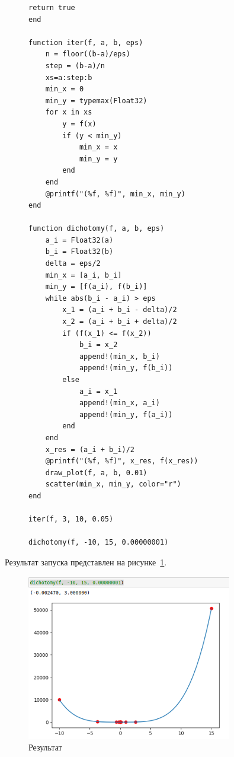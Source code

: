 \documentclass[a4paper, 14pt]{extarticle}
\begin{document}
\begin{figure}[!htb]
\begin{lstlisting}[language={},caption={Нахождение минимумов функции (продолжение)},label={lst:code2}]
    return true
end

function iter(f, a, b, eps)
    n = floor((b-a)/eps)
    step = (b-a)/n
    xs=a:step:b
    min_x = 0
    min_y = typemax(Float32)
    for x in xs
        y = f(x)
        if (y < min_y)
            min_x = x
            min_y = y
        end
    end
    @printf("(%f, %f)", min_x, min_y)
end

function dichotomy(f, a, b, eps)
    a_i = Float32(a)
    b_i = Float32(b)
    delta = eps/2
    min_x = [a_i, b_i]
    min_y = [f(a_i), f(b_i)]
    while abs(b_i - a_i) > eps
        x_1 = (a_i + b_i - delta)/2
        x_2 = (a_i + b_i + delta)/2
        if (f(x_1) <= f(x_2))
            b_i = x_2
            append!(min_x, b_i)
            append!(min_y, f(b_i))
        else
            a_i = x_1
            append!(min_x, a_i)
            append!(min_y, f(a_i))
        end
    end
    x_res = (a_i + b_i)/2 
    @printf("(%f, %f)", x_res, f(x_res))
    draw_plot(f, a, b, 0.01)
    scatter(min_x, min_y, color="r")
end

iter(f, 3, 10, 0.05)

dichotomy(f, -10, 15, 0.00000001)
\end{lstlisting}
\end{figure}

Результат запуска представлен на рисунке~\ref{fig:img1}.

\begin{figure}[!htb]
	\centering
	\includegraphics[width=0.8\textwidth]{img1}
\caption{Результат}
\label{fig:img1}
\end{figure}
\end{document}
